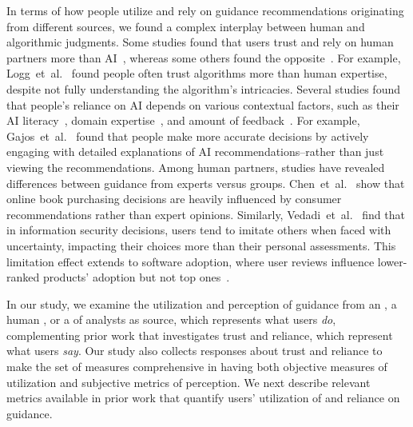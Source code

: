 In terms of how people utilize and rely on guidance recommendations originating from different sources, we found a complex interplay between human and algorithmic judgments.
Some studies found that users trust and rely on human partners more than AI~\cite{liu2022will, fehr2005neuroeconomic, bansal2019case, elish2019moral, green2022flaws, koulu2020human}, whereas some others found the opposite~\cite{logg2019algorithm, lu2021human, gajos2022people}.
For example, Logg~et~al.~\cite{logg2019algorithm} found people often trust algorithms more than human expertise, despite not fully understanding the algorithm's intricacies.
Several studies found that people's reliance on AI depends on various contextual factors, such as their AI literacy~\cite{jacobs2021machine}, domain expertise~\cite{gaube2021ai}, and amount of feedback~\cite{gajos2022people}.
For example, Gajos~et~al.~\cite{gajos2022people} found that people make more accurate decisions by actively engaging with detailed explanations of AI recommendations--rather than just viewing the recommendations.
Among human partners, studies have revealed differences between guidance from experts versus groups.
Chen~et~al.~\cite{chen2008herd} show that online book purchasing decisions are heavily influenced by consumer recommendations rather than expert opinions. Similarly, Vedadi~et~al.~\cite{vedadi2021herd} find that in information security decisions, users tend to imitate others when faced with uncertainty, impacting their choices more than their personal assessments. This limitation effect extends to software adoption, where user reviews influence lower-ranked products' adoption but not top ones~\cite{duan2009informational}.

In our study, we examine the utilization and perception of guidance from an \ai{}, a human \expert{}, or a \group{} of analysts as source, which represents what users \textit{do}, complementing prior work that investigates trust and reliance, which represent what users \textit{say}. Our study also collects  responses about trust and reliance to make the set of measures comprehensive in having both objective measures of utilization and subjective metrics of perception. We next describe relevant metrics available in prior work that quantify users' utilization of and reliance on guidance.

